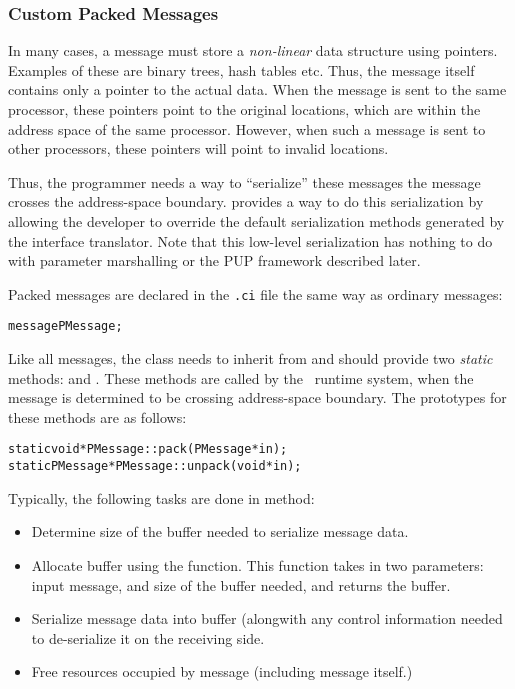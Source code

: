 \subsubsection{Custom Packed Messages}


In many cases, a message must store a {\em non-linear} data structure using
pointers.  Examples of these are binary trees, hash tables etc. Thus, the
message itself contains only a pointer to the actual data. When the message is
sent to the same processor, these pointers point to the original locations,
which are within the address space of the same processor. However, when such a
message is sent to other processors, these pointers will point to invalid
locations.

Thus, the programmer needs a way to ``serialize'' these messages
 the
message crosses the address-space boundary.  \charmpp{} provides a way to do
this serialization by allowing the developer to override the default
serialization methods generated by the \charmpp{} interface translator.
Note that this low-level serialization has nothing to do with parameter
marshalling or the PUP framework described later.

Packed messages are declared in the {\tt .ci} file the same way as ordinary
messages:

\begin{alltt}
message PMessage;
\end{alltt}

Like all messages, the class  needs to inherit from
 and should provide two {\em static} methods: 
and . These methods are called by the \charmpp\ runtime system, when
the message is determined to be crossing address-space boundary. The prototypes
for these methods are as follows:

\begin{alltt}
static void *PMessage::pack(PMessage *in);
static PMessage *PMessage::unpack(void *in);
\end{alltt}

Typically, the following tasks are done in  method:

\begin{itemize}

\item Determine size of the buffer needed to serialize message data.

\item Allocate buffer using the  function. This function
takes in two parameters: input message, and size of the buffer needed, and
returns the buffer.

\item Serialize message data into buffer (alongwith any control information
needed to de-serialize it on the receiving side.

\item Free resources occupied by message (including message itself.)  

\end{itemize}

